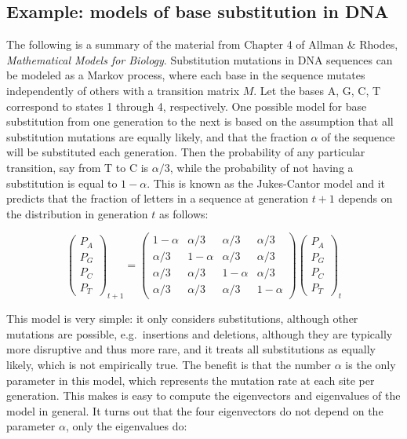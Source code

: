 \documentclass[
  letterpaper,
  DIV=11,
  numbers=noendperiod]{scrreprt}
\begin{document}
\subsection{Example: models of base substitution in
DNA}\label{example-models-of-base-substitution-in-dna}

The following is a summary of the material from Chapter 4 of Allman \&
Rhodes, \emph{Mathematical Models for Biology}. Substitution mutations
in DNA sequences can be modeled as a Markov process, where each base in
the sequence mutates independently of others with a transition matrix
\(M\). Let the bases A, G, C, T correspond to states 1 through 4,
respectively. One possible model for base substitution from one
generation to the next is based on the assumption that all substitution
mutations are equally likely, and that the fraction \(\alpha\) of the
sequence will be substituted each generation. Then the probability of
any particular transition, say from T to C is \(\alpha/3\), while the
probability of not having a substitution is equal to \(1-\alpha\). This
is known as the Jukes-Cantor model and it predicts that the fraction of
letters in a sequence at generation \(t+1\) depends on the distribution
in generation \(t\) as follows:

\[   
\left(\begin{array}{c} P_A \\ P_G \\ P_C \\ P_T \end{array}\right)_{t+1}  = \left(\begin{array}{cccc}1-\alpha & \alpha/3 & \alpha/3 & \alpha/3 \\\alpha/3 & 1-\alpha & \alpha/3 & \alpha/3 \\\alpha/3 & \alpha/3 & 1-\alpha & \alpha/3 \\\alpha/3 & \alpha/3 & \alpha/3 & 1-\alpha\end{array}\right) \left(\begin{array}{c} P_A \\ P_G \\ P_C \\ P_T \end{array}\right)_t 
\]

This model is very simple: it only considers substitutions, although
other mutations are possible, e.g.~insertions and deletions, although
they are typically more disruptive and thus more rare, and it treats all
substitutions as equally likely, which is not empirically true. The
benefit is that the number \(\alpha\) is the only parameter in this
model, which represents the mutation rate at each site per generation.
This makes is easy to compute the eigenvectors and eigenvalues of the
model in general. It turns out that the four eigenvectors do not depend
on the parameter \(\alpha\), only the eigenvalues do:
\end{document}
